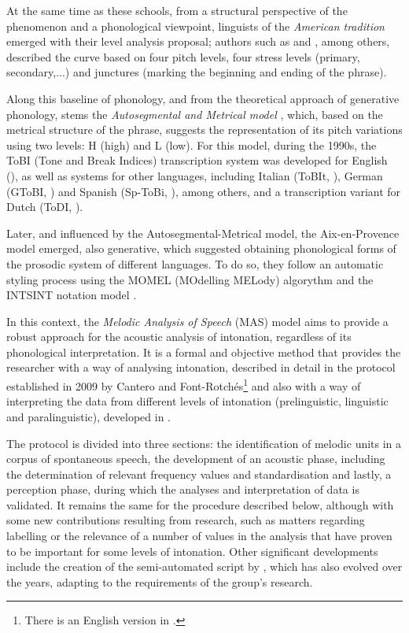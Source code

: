 \documentclass[output=paper]{langscibook}
\begin{document}
At the same time as these schools, from a structural perspective of the phenomenon and a phonological viewpoint, linguists of the \textit{American tradition} e\-merged with their level analysis proposal; authors such as \citet{Pike.1945} and \citet{Trager.1951}, among others, described the curve based on four pitch levels, four stress levels (primary, secondary,...) and junctures (marking the beginning and ending of the phrase). 

Along this baseline of phonology, and from the theoretical approach of generative phonology, stems the \textit{Autosegmental and Metrical model} \citep{Pierrehumbert1980,Pierrehumbert.1987}, which, based on the metrical structure of the phrase, suggests the representation of its pitch variations using two levels: H (high) and L (low). For this model, during the 1990s, the ToBI (Tone and Break Indices) transcription system was developed for English (\citealt{Silverman1992,BeckmanHirschberg1994}), as well as systems for other languages, including Italian (ToBIt, \citealt{Avesani1995}), German (GToBI, \citealt{Grice.1996}) and Spanish (Sp-ToBi, \citealt{Beckman.2002}), among others, and a transcription variant for Dutch (ToDI, \citealt{Gussenhoven.1999ToDI}).

Later, and influenced by the Autosegmental-Metrical model, the Aix-en-Pro\-vence model emerged, also generative, which suggested obtaining phonological forms of the prosodic system of different languages. To do so, they follow an automatic styling process using the MOMEL (MOdelling MELody) algorythm and the INTSINT notation model \citep{Hirst2000}. 

In this context, the \textit{Melodic Analysis of Speech} (MAS) model aims to provide a robust approach for the acoustic analysis of intonation, regardless of its phonological interpretation. It is a formal and objective method that provides the researcher with a way of analysing intonation, described in detail in the protocol established in 2009 by Cantero and Font-Rotchés\footnote{There is an English version in \citet{Cantero2009}.} and also with a way of interpreting the data from different levels of intonation (prelinguistic, linguistic and paralinguistic), developed in \citet{CanteroSerena.op.2002}.

The protocol is divided into three sections: the identification of melodic units in a corpus of spontaneous speech, the development of an acoustic phase, including the determination of relevant frequency values and standardisation and lastly, a perception phase, during which the analyses and interpretation of data is validated. It remains the same for the procedure described below, although with some new contributions resulting from research, such as matters regarding labelling or the relevance of a number of values in the analysis that have proven to be important for some levels of intonation. Other significant developments include the creation of the semi-automated script by \citet{MateoRuiz.2010Scripts}, which has also evolved over the years, adapting to the requirements of the group's research. 
\end{document}
